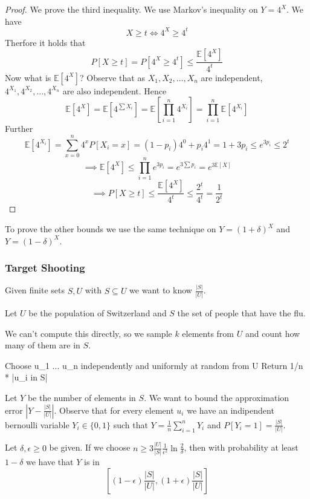 \begin{proof}
	We prove the third inequality. We use Markov's inequality on $Y = 4^X$.
	We have
	$$X \geq t \iff 4^X \geq 4^t$$
	Therfore it holds that
	$$P[X \geq t] = P[4^X \geq 4^t] \leq \frac{\mathbb{E}[4^X]}{4^t}$$
	Now what is $\mathbb{E}[4^X]$? Observe that as $X_1, X_2, \dots, X_n$ are independent, $4^{X_1}, 4^{X_2}, \dots, 4^{X_n}$ are also independent. Hence
	$$\mathbb{E}[4^X] = \mathbb{E}[4^{\sum X_i}] = \mathbb{E}[\prod_{i=1}^n 4^{X_i}] = \prod_{i=1}^n \mathbb{E}[4^{X_i}]$$
	Further
	$$\mathbb{E}[4^{X_i}] = \sum_{x=0}^n 4^x P[X_i=x] = (1-p_i) 4^0 + p_i 4^1 = 1 + 3p_i \leq e^{3p_i} \leq 2^t$$
	$$\implies \mathbb{E}[4^X] \leq \prod_{i=1}^n e^{3p_i} = e^{3\sum p_i} = e^{3\mathbb{E}[X]}$$
	$$\implies P[X \geq t] \leq \frac{\mathbb{E}[4^X]}{4^t} \leq \frac{2^t}{4^t} = \frac{1}{2^t}$$
\end{proof}

\begin{remark}
	To prove the other bounds we use the same technique on $Y = (1+\delta)^X$ and $Y = (1-\delta)^X$.
\end{remark}

\subsubsection{Target Shooting}

Given finite sets $S, U$ with $S \subseteq U$ we want to know $\frac{|S|}{|U|}$.
\begin{example}
	Let $U$ be the population of Switzerland and $S$ the set of people that have the flu.
\end{example}

We can't compute this directly, so we sample $k$ elements from $U$ and count how many of them are in $S$.

\begin{algorithm}
	Choose u_1 ... u_n independently and uniformly at random from U
	Return 1/n * |{u_i in S}|
\end{algorithm}

Let $Y$ be the number of elements in $S$. We want to bound the approximation error $|Y - \frac{|S|}{|U|}|$. Observe that for every element $u_i$ we have an indipendent bernoulli variable $Y_i \in \{0,1\}$ such that $Y = \frac{1}{n} \sum_{i=1}^n Y_i$ and $P[Y_i=1] = \frac{|S|}{|U|}$.

\begin{theorem}
	Let $\delta, \epsilon \ge 0$ be given. If we choose $n \geq 3 \frac{|U|}{|S|} \frac{1}{\epsilon^2} \ln \frac{2}{\delta}$, then with probability at least $1-\delta$ we have that $Y$ is in
	$$[(1-\epsilon)\frac{|S|}{|U|}, (1+\epsilon)\frac{|S|}{|U|}]$$
\end{theorem}

